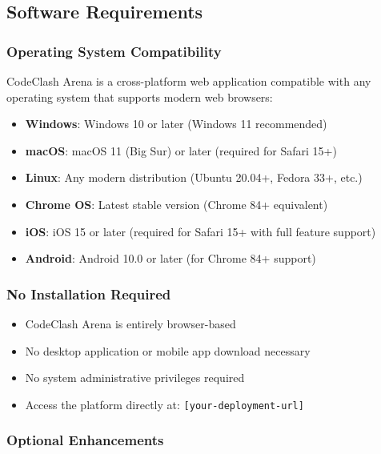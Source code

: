 \documentclass[12pt,a4paper]{article}
\begin{document}
\subsection{Software Requirements}

\subsubsection{Operating System Compatibility}

CodeClash Arena is a cross-platform web application compatible with any operating system that supports modern web browsers:

\begin{itemize}[leftmargin=*]
\item \textbf{Windows}: Windows 10 or later (Windows 11 recommended)
\item \textbf{macOS}: macOS 11 (Big Sur) or later (required for Safari 15+)
\item \textbf{Linux}: Any modern distribution (Ubuntu 20.04+, Fedora 33+, etc.)
\item \textbf{Chrome OS}: Latest stable version (Chrome 84+ equivalent)
\item \textbf{iOS}: iOS 15 or later (required for Safari 15+ with full feature support)
\item \textbf{Android}: Android 10.0 or later (for Chrome 84+ support)
\end{itemize}

\subsubsection{No Installation Required}

\begin{itemize}[leftmargin=*]
\item CodeClash Arena is entirely browser-based
\item No desktop application or mobile app download necessary
\item No system administrative privileges required
\item Access the platform directly at: \texttt{[your-deployment-url]}
\end{itemize}

\subsubsection{Optional Enhancements}
\end{document}
